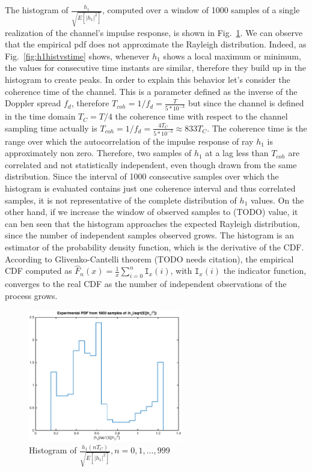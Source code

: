 \documentclass[10pt]{article}
\begin{document}
The histogram of $\frac{h_1}{\sqrt{E[|h_1|^2]}}$, computed over a window of 1000 samples of a single realization of the channel's impulse response, is shown in Fig.~\ref{fig:h1hist}. We can observe that the empirical pdf does not approximate the Rayleigh distribution. Indeed, as Fig.~\ref{fig:h1histvstime} shows, whenever $h_1$ shows a local maximum or minimum, the values for consecutive time instants are similar, therefore they build up in the histogram to create peaks. In order to explain this behavior let's consider the coherence time of the channel. This is a parameter defined as the inverse of the Doppler spread $f_d$, therefore $T_{coh} = 1/f_d = \frac{T}{5*10^{-3}}$ but since the channel is defined in the time domain $T_C = T/4$ the coherence time with respect to the channel sampling time actually is $T_{coh} = 1/f_d = \frac{4T_C}{5*10^{-3}} \approx 833T_C$.
The coherence time is the range over which the autocorrelation of the impulse response of ray $h_1$ is approximately non zero. Therefore, two samples of $h_1$ at a lag less than $T_{coh}$ are correlated and not statistically independent, even though drawn from the same distribution. Since the interval of 1000 consecutive samples over which the histogram is evaluated contains just one coherence interval and thus correlated samples, it is not representative of the complete distribution of $h_1$ values. On the other hand, if we increase the window of observed samples to (TODO) value, it can ben seen that the histogram approaches the expected Rayleigh distribution, since the number of independent samples observed grows. The histogram is an estimator of the probability density function, which is the derivative of the CDF. According to Glivenko-Cantelli theorem (TODO needs citation), the empirical CDF computed as $\hat{F}_n(x) = \frac{1}{x}\sum_{i = 0}^n \texttt{I}_x(i)$, with $\texttt{I}_x(i)$ the indicator function, converges to the real CDF as the number of independent observations of the process grows.

\begin{figure}[h!]
  \centering
  \includegraphics[width = 0.6\textwidth]{p01_h1hist}
  \caption{Histogram of $\frac{h_1(nT_C)}{\sqrt{E[|h_1|^2]}}, n = 0, 1, \dots, 999$}
  \label{fig:h1hist}
\end{figure}
\end{document}
